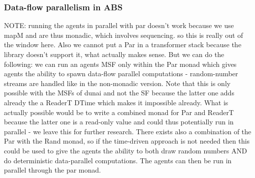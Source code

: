 \subsubsection{Data-flow parallelism in ABS}
NOTE: running the agents in parallel with par doesn't work because we use mapM and are thus monadic, which involves sequencing. so this is really out of the window here. Also we cannot put a Par in a transformer stack because the library doesn't support it, what actually makes sense. But we can do the following: we can run an agents MSF only within the Par monad which gives agents the ability to spawn data-flow parallel computations - random-number streams are handled like in the non-monadic version. Note that this is only possible with the MSFs of dunai and not the SF because the latter one adds already the a ReaderT DTime which makes it impossible already. 
What is actually possible would be to write a combined monad for Par and ReaderT because the latter one is a read-only value and could thus potentially run in parallel - we leave this for further research. There exists also a combination of the Par with the Rand monad, so if the time-driven approach is not needed then this could be used to give the agents the ability to both draw random numbers AND do deterministic data-parallel computations. The agents can then be run in parallel through the par monad.
